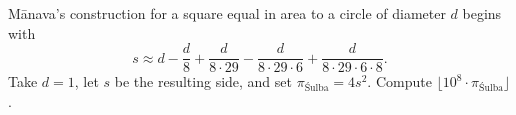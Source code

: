 
Mānava’s construction for a square equal in area to a circle of diameter \(d\) begins with
\[
  s \approx d - \frac{d}{8} + \frac{d}{8\cdot 29} - \frac{d}{8\cdot 29\cdot 6} + \frac{d}{8\cdot 29\cdot 6\cdot 8}.
\]
Take \(d=1\), let \(s\) be the resulting side, and set \(\pi_{\mathrm{Śulba}} = 4s^2\). Compute \(\lfloor 10^8 \cdot \pi_{\mathrm{Śulba}} \rfloor\).
